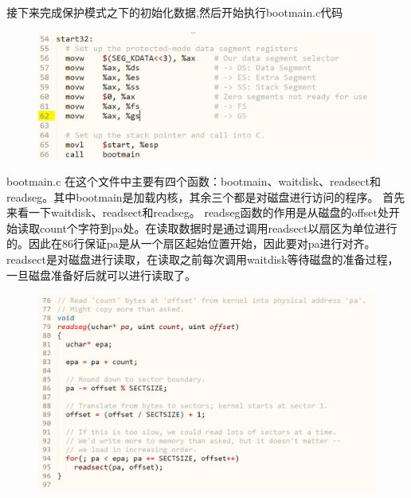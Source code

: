 \documentclass[a4paper,12pt]{report}
\begin{document}
接下来完成保护模式之下的初始化数据,然后开始执行bootmain.c代码
\begin{figure}[H]
	\centering
	\includegraphics [width=1.0\textwidth]{figure//image92.png}
\end{figure}


bootmain.c
在这个文件中主要有四个函数：bootmain、waitdisk、readsect和readseg。其中bootmain是加载内核，其余三个都是对磁盘进行访问的程序。
首先来看一下waitdisk、readsect和readseg。 readseg函数的作用是从磁盘的offset处开始读取count个字符到pa处。在读取数据时是通过调用readsect以扇区为单位进行的。因此在86行保证pa是从一个扇区起始位置开始，因此要对pa进行对齐。readsect是对磁盘进行读取，在读取之前每次调用waitdisk等待磁盘的准备过程，一旦磁盘准备好后就可以进行读取了。
\begin{figure}[H]
	\centering
	\includegraphics [width=1.0\textwidth]{figure//image93.png}
\end{figure}
\end{document}
